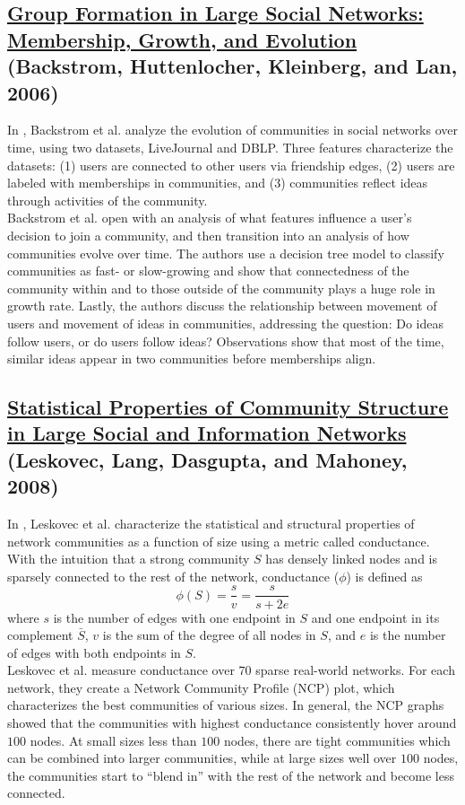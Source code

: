 \documentclass[11pt, final]{article}
\newcommand{\br}[1][.75]{\ \\[#1\baselineskip]}
\begin{document}
\subsection{\href{http://snap.stanford.edu/class/cs224w-readings/backstrom06groupformation.pdf}{Group Formation in Large Social Networks: Membership, Growth, and Evolution} (Backstrom, Huttenlocher, Kleinberg, and Lan, 2006)}

In \cite{3}, Backstrom et al. analyze the evolution of communities in social networks over time, using two datasets, LiveJournal and DBLP. Three features characterize the datasets: (1) users are connected to other users via friendship edges, (2) users are labeled with memberships in communities, and (3) communities reflect ideas through activities of the community.\br
Backstrom et al. open with an analysis of what features influence a user's decision to join a community, and then transition into an analysis of how communities evolve over time. The authors use a decision tree model to classify communities as fast- or slow-growing and show that connectedness of the community within and to those outside of the community plays a huge role in growth rate. Lastly, the authors discuss the relationship between movement of users and movement of ideas in communities, addressing the question: Do ideas follow users, or do users follow ideas? Observations show that most of the time, similar ideas appear in two communities before memberships align.

\subsection{\href{http://snap.stanford.edu/class/cs224w-readings/leskovec08ncp.pdf}{Statistical Properties of Community Structure in Large Social and Information Networks} (Leskovec, Lang, Dasgupta, and Mahoney, 2008)}

In \cite{4}, Leskovec et al. characterize the statistical and structural properties of network communities as a function of size using a metric called conductance. With the intuition that a strong community $S$ has densely linked nodes and is sparsely connected to the rest of the network, conductance ($\phi$) is defined as
\[\phi(S) = \frac{s}{v} = \frac{s}{s + 2e}\]
where $s$ is the number of edges with one endpoint in $S$ and one endpoint in its complement $\bar{S}$, $v$ is the sum of the degree of all nodes in $S$, and $e$ is the number of edges with both endpoints in $S$.\br
Leskovec et al. measure conductance over $70$ sparse real-world networks. For each network, they create a Network Community Profile (NCP) plot, which characterizes the best communities of various sizes. In general, the NCP graphs showed that the communities with highest conductance consistently hover around $100$ nodes. At small sizes less than $100$ nodes, there are tight communities which can be combined into larger communities, while at large sizes well over $100$ nodes, the communities start to ``blend in'' with the rest of the network and become less connected.
\end{document}
